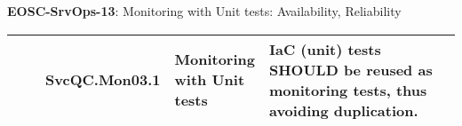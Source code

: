 \textbf{EOSC-SrvOps-13}: Monitoring with Unit tests: Availability, Reliability
\nopagebreak[4]
\begin{center}
    \tabletail{\hline}
    \tiny
    \begin{supertabular}{|p{0.10\linewidth}|p{0.10\linewidth}|p{0.20\linewidth}|p{0.60\linewidth}|} \hline
        \cite{orviz_fernandez_eosc-synergy_2020} & SvcQC.Mon03.1 & Monitoring with Unit tests & IaC (unit) tests SHOULD be reused as monitoring tests, thus avoiding duplication.\\ \hline
    \end{supertabular}
\end{center}

